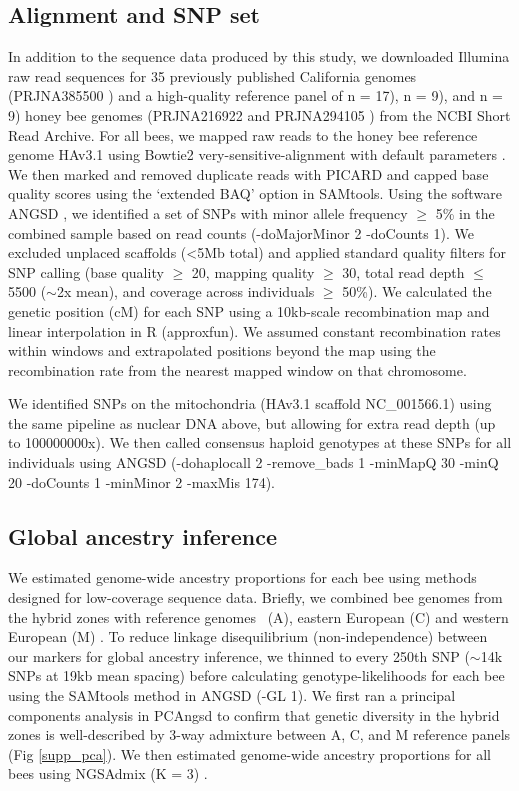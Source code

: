 \subsection*{Alignment and SNP set}
In addition to the sequence data produced by this study, we downloaded Illumina raw read sequences for 35 previously published California genomes (PRJNA385500 \cite{Cridland:2018fx}) and a high-quality reference panel of   n = 17),  n = 9), and  n = 9) honey bee genomes (PRJNA216922 \cite{Harpur:2014ei} and PRJNA294105 \cite{Cridland:2017el}) from the NCBI Short Read Archive. For all bees, we mapped raw reads to the honey bee reference genome HAv3.1 \cite{Wallberg:2019fd} using Bowtie2 very-sensitive-alignment with default parameters \cite{Langmead:2012jh}. We then marked and removed duplicate reads with PICARD and capped base quality scores using the ‘extended BAQ' option in SAMtools. Using the software ANGSD \cite{Korneliussen:2014cx}, we identified a set of SNPs with minor allele frequency $\geq$ 5\% in the combined sample based on read counts (-doMajorMinor 2 -doCounts 1). We excluded unplaced scaffolds (\textless 5Mb total) and applied standard quality filters for SNP calling (base quality $\geq$ 20, mapping quality $\geq$ 30, total read depth $\leq$ 5500 ($\sim$2x mean), and coverage across individuals $\geq$ 50\%). We calculated the genetic position (cM) for each SNP using a 10kb-scale recombination map \cite{Jones:2019wg} and linear interpolation in R (approxfun). We assumed constant recombination rates within windows and extrapolated positions beyond the map using the recombination rate from the nearest mapped window on that chromosome. 

We identified SNPs on the mitochondria (HAv3.1 scaffold NC\_001566.1) using the same pipeline as nuclear DNA above, but allowing for extra read depth (up to 100000000x). We then called consensus haploid genotypes at these SNPs for all individuals using ANGSD (-dohaplocall 2 -remove\_bads 1 -minMapQ 30 -minQ 20 -doCounts 1 -minMinor 2 -maxMis 174).

\subsection*{Global ancestry inference}
We estimated genome-wide ancestry proportions for each bee using methods designed for low-coverage sequence data. Briefly, we combined bee genomes from the hybrid zones with reference genomes  \scutellata\ (A), eastern European (C) and western European (M) . To reduce linkage disequilibrium (non-independence) between our markers for global ancestry inference, we thinned to every 250th SNP ($\sim$14k SNPs at 19kb mean spacing) before calculating genotype-likelihoods for each bee using the SAMtools method in ANGSD (-GL 1). We first ran a principal components analysis in PCAngsd \cite{Meisner:2018fq} to confirm that genetic diversity in the hybrid zones is well-described by 3-way admixture between A, C, and M reference panels (Fig \ref{supp_pca}). We then estimated genome-wide ancestry proportions for all bees using NGSAdmix (K = 3) \cite{Skotte:2013fk}.


